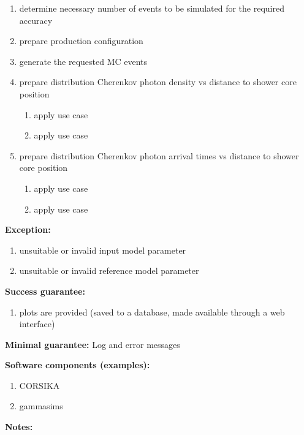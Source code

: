 \begin{enumerate}
    \item determine necessary number of events to be simulated for the required accuracy
    \item prepare production configuration
    \item generate the requested MC events
    \item prepare distribution Cherenkov photon density vs distance to shower core position
    \begin{enumerate}
        \item apply use case 
        \item apply use case 
    \end{enumerate}
    \item prepare distribution  Cherenkov photon arrival times vs distance to shower core position 
    \begin{enumerate}
        \item apply use case 
        \item apply use case 
    \end{enumerate}
\end{enumerate}

\textbf{Exception:}
\begin{enumerate}
    \item unsuitable or invalid input model parameter
    \item unsuitable or invalid reference model parameter
\end{enumerate}

\textbf{Success guarantee:}
\begin{enumerate}
    \item plots are provided (saved to a database, made available through a web interface)
\end{enumerate}

\textbf{Minimal guarantee:}
Log and error messages

\textbf{Software components (examples):}
\begin{enumerate}
    \item CORSIKA
    \item gammasims
\end{enumerate}

\textbf{Notes:}


